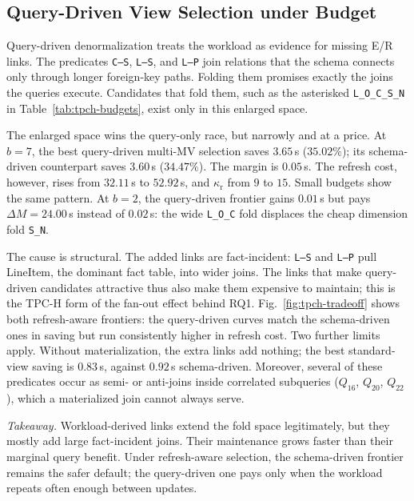 \documentclass[sigconf]{acmart}
\begin{document}
\subsection{Query-Driven View Selection under Budget}\label{sec:tpch:query}

Query-driven denormalization treats the workload as evidence for missing E/R links. The predicates \texttt{C--S}, \texttt{L--S}, and \texttt{L--P} join relations that the schema connects only through longer foreign-key paths. Folding them promises exactly the joins the queries execute. Candidates that fold them, such as the asterisked \texttt{L\_O\_C\_S\_N} in Table~\ref{tab:tpch-budgets}, exist only in this enlarged space.

The enlarged space wins the query-only race, but narrowly and at a price. At $b=7$, the best query-driven multi-MV selection saves $3.65$\,s ($35.02\%$); its schema-driven counterpart saves $3.60$\,s ($34.47\%$). The margin is $0.05$\,s. The refresh cost, however, rises from $32.11$\,s to $52.92$\,s, and $\kappa_{\mathrm r}$ from $9$ to $15$. Small budgets show the same pattern. At $b=2$, the query-driven frontier gains $0.01$\,s but pays $\Delta M=24.00$\,s instead of $0.02$\,s: the wide \texttt{L\_O\_C} fold displaces the cheap dimension fold \texttt{S\_N}.

The cause is structural. The added links are fact-incident: \texttt{L--S} and \texttt{L--P} pull \textsf{LineItem}, the dominant fact table, into wider joins. The links that make query-driven candidates attractive thus also make them expensive to maintain; this is the TPC-H form of the fan-out effect behind RQ1. Fig.~\ref{fig:tpch-tradeoff} shows both refresh-aware frontiers: the query-driven curves match the schema-driven ones in saving but run consistently higher in refresh cost. Two further limits apply. Without materialization, the extra links add nothing; the best standard-view saving is $0.83$\,s, against $0.92$\,s schema-driven. Moreover, several of these predicates occur as semi- or anti-joins inside correlated subqueries ($Q_{16}$, $Q_{20}$, $Q_{22}$), which a materialized join cannot always serve.

\noindent\emph{Takeaway.} Workload-derived links extend the fold space legitimately, but they mostly add large fact-incident joins. Their maintenance grows faster than their marginal query benefit. Under refresh-aware selection, the schema-driven frontier remains the safer default; the query-driven one pays only when the workload repeats often enough between updates.
\end{document}
